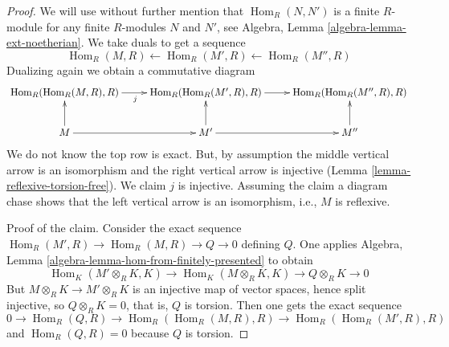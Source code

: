 \documentclass[10pt,a4paper]{amsart}
\theoremstyle{plain}
\theoremstyle{definition}
\theoremstyle{remark}
\numberwithin{equation}{subsection}
\def\Hom{\mathop{\mathrm{Hom}}\nolimits}
\begin{document}
\begin{proof}
We will use without further mention that $\Hom_R(N, N')$ is a finite
$R$-module for any finite $R$-modules $N$ and $N'$, see
Algebra, Lemma \ref{algebra-lemma-ext-noetherian}.
We take duals to get a sequence
$$
\Hom_R(M, R) \leftarrow \Hom_R(M', R) \leftarrow \Hom_R(M'', R)
$$
Dualizing again we obtain a commutative diagram
$$
\xymatrix{
\Hom_R(\Hom_R(M, R), R) \ar[r]_j &
\Hom_R(\Hom_R(M', R), R) \ar[r] &
\Hom_R(\Hom_R(M'', R), R) \\
M \ar[u] \ar[r] & M' \ar[u] \ar[r] & M'' \ar[u]
}
$$
We do not know the top row is exact. But, by assumption
the middle vertical arrow is an isomorphism and the right
vertical arrow is injective (Lemma \ref{lemma-reflexive-torsion-free}).
We claim $j$ is injective. Assuming the claim
a diagram chase shows that the left vertical
arrow is an isomorphism, i.e., $M$ is reflexive.

\medskip\noindent
Proof of the claim. Consider the exact sequence
$\Hom_R(M',R)\to \Hom_R(M,R)\to Q \to 0$
defining $Q$. One applies
Algebra, Lemma \ref{algebra-lemma-hom-from-finitely-presented}
to obtain
$$
\Hom_K(M'\otimes_R K,K) \to
\Hom_K(M\otimes_R K,K) \to
Q\otimes_R K\to 0
$$
But $M \otimes_R K \to M' \otimes_R K$ is an injective map of vector spaces,
hence split injective, so $Q \otimes_R K = 0$, that is, $Q$ is torsion.
Then one gets the exact sequence 
$$
0 \to \Hom_R(Q,R) \to
\Hom_R(\Hom_R(M,R),R) \to
\Hom_R(\Hom_R(M',R),R)
$$
and $\Hom_R(Q,R)=0$ because $Q$ is torsion.
\end{proof}
\end{document}
